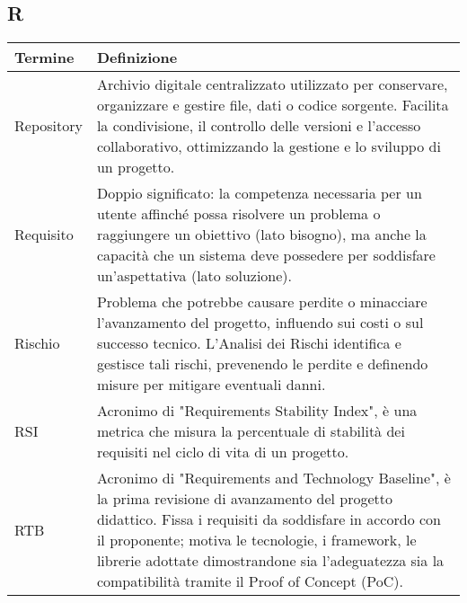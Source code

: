 \documentclass[10pt]{article}
\begin{document}
\subsection{R} %
\begin{longtable}{|>{\centering\arraybackslash}m{2.5cm}|>{\arraybackslash}m{12.5cm}|}
\hline
\rowcolor[gray]{0.8}
\textbf{Termine} & \textbf{Definizione}\\
\endhead
\hline
Repository & Archivio digitale centralizzato utilizzato per conservare, organizzare e gestire file, dati o codice sorgente. Facilita la condivisione, il controllo delle versioni e l'accesso collaborativo, ottimizzando la gestione e lo sviluppo di un progetto.\\
\hline
Requisito & Doppio significato: la competenza necessaria per un utente affinché possa risolvere un problema o raggiungere un obiettivo (lato bisogno), ma anche la capacità che un sistema deve possedere per soddisfare un'aspettativa (lato soluzione).\\
\hline
Rischio & Problema che potrebbe causare perdite o minacciare l'avanzamento del progetto, influendo sui costi o sul successo tecnico. L'Analisi dei Rischi identifica e gestisce tali rischi, prevenendo le perdite e definendo misure per mitigare eventuali danni.\\
\hline
RSI & Acronimo di "Requirements Stability Index", è una metrica che  misura la percentuale di stabilità dei requisiti nel ciclo di vita di un progetto.\\
\hline
RTB & Acronimo di "Requirements and Technology Baseline", è la prima revisione di avanzamento del progetto didattico. Fissa i requisiti da soddisfare in accordo con il proponente; motiva le tecnologie, i framework, le librerie adottate dimostrandone sia l'adeguatezza sia la compatibilità tramite il Proof of Concept (PoC).\\
\hline
\end{longtable}
\end{document}
